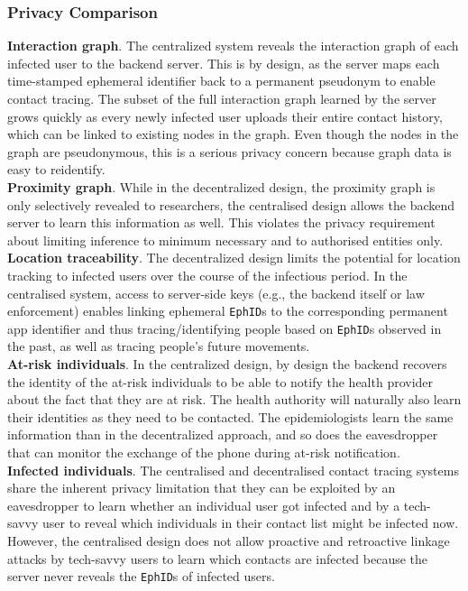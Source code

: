 \documentclass[12pt,a4paper]{article}
\begin{document}
\subsubsection*{Privacy Comparison}
\textbf{Interaction graph}. The centralized system reveals the interaction graph of each infected user to the backend server. This is by design, as the server maps each time-stamped ephemeral identifier back to a permanent pseudonym to enable contact tracing. The subset of the full interaction graph learned by the server grows quickly as every newly infected user uploads their entire contact history, which can be linked to existing nodes in the graph. Even though the nodes in the graph are pseudonymous, this is a serious privacy concern because graph data is easy to reidentify.\\[0.3cm]
\textbf{Proximity graph}. While in the decentralized design, the proximity graph is only selectively revealed to researchers, the centralised design allows the backend server to learn this information as well. This violates the privacy requirement about limiting inference to minimum necessary and to authorised entities only.\\[0.3cm]
\textbf{Location traceability}. The decentralized design limits the potential for location tracking to infected users over the course of the infectious period. In the centralised system, access to server-side keys (e.g., the backend itself or law enforcement) enables linking ephemeral \texttt{EphID}s to the corresponding permanent app identifier and thus tracing/identifying people based on \texttt{EphID}s  observed in the past, as well as tracing people’s future movements.\\[0.3cm]
\textbf{At-risk individuals}. In the centralized design, by design the backend recovers the identity of the at-risk individuals to be able to notify the health provider about the fact that they are at risk. The health authority will naturally also learn their identities as they need to be contacted. The epidemiologists learn the same information than in the decentralized approach, and so does the eavesdropper that can monitor the exchange of the phone during at-risk notification.\\[0.3cm]
\textbf{Infected individuals}. The centralised and decentralised contact tracing systems share the
inherent privacy limitation that they can be exploited by an eavesdropper to learn whether an individual user got infected and by a tech-savvy user to reveal which individuals in their contact list might be infected now. However, the centralised design does not allow proactive and retroactive linkage attacks by tech-savvy users to learn which contacts are infected because the server never reveals the \texttt{EphID}s of infected users.\\[0.3cm]
\end{document}
